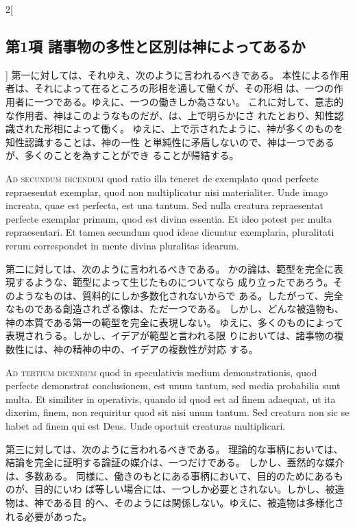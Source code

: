 \documentclass[paper=a4paper,fontsize=10pt,jafontsize=9pt,titlepage]{jlreq}
\begin{document}
\begin{paracol}{2}[\subsection{第1項 諸事物の多性と区別は神によってあるか}]
第一に対しては、それゆえ、次のように言われるべきである。
本性による作用者は、それによって在るところの形相を通して働くが、その形相
 は、一つの作用者に一つである。ゆえに、一つの働きしか為さない。
これに対して、意志的な作用者、神はこのようなものだが、は、上で明らかにさ
 れたとおり、知性認識された形相によって働く。
ゆえに、上で示されたように、神が多くのものを知性認識することは、神の一性
 と単純性に矛盾しないので、神は一つであるが、多くのことを為すことができ
 ることが帰結する。


\switchcolumn*[\subsection{ad.2}]


{\scshape Ad secundum dicendum} quod ratio illa teneret
 de exemplato quod perfecte repraesentat exemplar, quod non
 multiplicatur nisi materialiter. Unde imago increata, quae est
 perfecta, est una tantum. Sed nulla creatura repraesentat perfecte
 exemplar primum, quod est divina essentia. Et ideo potest per multa
 repraesentari. Et tamen secundum quod ideae dicuntur exemplaria,
 pluralitati rerum correspondet in mente divina pluralitas idearum.


\switchcolumn


第二に対しては、次のように言われるべきである。
かの論は、範型を完全に表現するような、範型によって生じたものについてなら
 成り立ったであろう。そのようなものは、質料的にしか多数化されないからで
 ある。したがって、完全なものである創造されざる像は、ただ一つである。
しかし、どんな被造物も、神の本質である第一の範型を完全に表現しない。
ゆえに、多くのものによって表現されうる。しかし、イデアが範型と言われる限
 りにおいては、諸事物の複数性には、神の精神の中の、イデアの複数性が対応
 する。


\switchcolumn*[\subsection{ad.3}]


{\scshape Ad tertium dicendum} quod in speculativis
 medium demonstrationis, quod perfecte demonstrat conclusionem, est unum
 tantum, sed media probabilia sunt multa. Et similiter in operativis,
 quando id quod est ad finem adaequat, ut ita dixerim, finem, non
 requiritur quod sit nisi unum tantum. Sed creatura non sic se habet ad
 finem qui est Deus. Unde oportuit creaturas multiplicari.


\switchcolumn


第三に対しては、次のように言われるべきである。
理論的な事柄においては、結論を完全に証明する論証の媒介は、一つだけである。
 しかし、蓋然的な媒介は、多数ある。
同様に、働きのもとにある事柄において、目的のためにあるものが、目的にいわ
 ば等しい場合には、一つしか必要とされない。しかし、被造物は、神である目
 的へ、そのようには関係しない。ゆえに、被造物は多様化される必要があった。


\switchcolumn*



\end{paracol}
\newpage
{}
\end{document}
